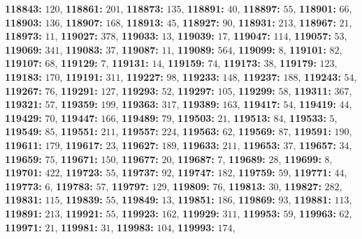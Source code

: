\textsf{\bfseries 118843:} $120$, \textsf{\bfseries 118861:} $201$, \textsf{\bfseries 118873:} $135$, \textsf{\bfseries 118891:} $40$, \textsf{\bfseries 118897:} $55$, \textsf{\bfseries 118901:} $66$, \textsf{\bfseries 118903:} $136$, \textsf{\bfseries 118907:} $168$, \textsf{\bfseries 118913:} $45$, \textsf{\bfseries 118927:} $90$, \textsf{\bfseries 118931:} $213$, \textsf{\bfseries 118967:} $21$, \textsf{\bfseries 118973:} $11$, \textsf{\bfseries 119027:} $378$, \textsf{\bfseries 119033:} $13$, \textsf{\bfseries 119039:} $17$, \textsf{\bfseries 119047:} $114$, \textsf{\bfseries 119057:} $53$, \textsf{\bfseries 119069:} $341$, \textsf{\bfseries 119083:} $37$, \textsf{\bfseries 119087:} $11$, \textsf{\bfseries 119089:} $564$, \textsf{\bfseries 119099:} $8$, \textsf{\bfseries 119101:} $82$, \textsf{\bfseries 119107:} $68$, \textsf{\bfseries 119129:} $7$, \textsf{\bfseries 119131:} $14$, \textsf{\bfseries 119159:} $74$, \textsf{\bfseries 119173:} $38$, \textsf{\bfseries 119179:} $123$, \textsf{\bfseries 119183:} $170$, \textsf{\bfseries 119191:} $311$, \textsf{\bfseries 119227:} $98$, \textsf{\bfseries 119233:} $148$, \textsf{\bfseries 119237:} $188$, \textsf{\bfseries 119243:} $54$, \textsf{\bfseries 119267:} $76$, \textsf{\bfseries 119291:} $127$, \textsf{\bfseries 119293:} $52$, \textsf{\bfseries 119297:} $105$, \textsf{\bfseries 119299:} $58$, \textsf{\bfseries 119311:} $367$, \textsf{\bfseries 119321:} $57$, \textsf{\bfseries 119359:} $199$, \textsf{\bfseries 119363:} $317$, \textsf{\bfseries 119389:} $163$, \textsf{\bfseries 119417:} $54$, \textsf{\bfseries 119419:} $44$, \textsf{\bfseries 119429:} $70$, \textsf{\bfseries 119447:} $166$, \textsf{\bfseries 119489:} $79$, \textsf{\bfseries 119503:} $21$, \textsf{\bfseries 119513:} $84$, \textsf{\bfseries 119533:} $5$, \textsf{\bfseries 119549:} $85$, \textsf{\bfseries 119551:} $211$, \textsf{\bfseries 119557:} $224$, \textsf{\bfseries 119563:} $62$, \textsf{\bfseries 119569:} $87$, \textsf{\bfseries 119591:} $190$, \textsf{\bfseries 119611:} $179$, \textsf{\bfseries 119617:} $23$, \textsf{\bfseries 119627:} $189$, \textsf{\bfseries 119633:} $211$, \textsf{\bfseries 119653:} $37$, \textsf{\bfseries 119657:} $34$, \textsf{\bfseries 119659:} $75$, \textsf{\bfseries 119671:} $150$, \textsf{\bfseries 119677:} $20$, \textsf{\bfseries 119687:} $7$, \textsf{\bfseries 119689:} $28$, \textsf{\bfseries 119699:} $8$, \textsf{\bfseries 119701:} $422$, \textsf{\bfseries 119723:} $55$, \textsf{\bfseries 119737:} $92$, \textsf{\bfseries 119747:} $182$, \textsf{\bfseries 119759:} $59$, \textsf{\bfseries 119771:} $44$, \textsf{\bfseries 119773:} $6$, \textsf{\bfseries 119783:} $57$, \textsf{\bfseries 119797:} $129$, \textsf{\bfseries 119809:} $76$, \textsf{\bfseries 119813:} $30$, \textsf{\bfseries 119827:} $282$, \textsf{\bfseries 119831:} $115$, \textsf{\bfseries 119839:} $55$, \textsf{\bfseries 119849:} $13$, \textsf{\bfseries 119851:} $186$, \textsf{\bfseries 119869:} $93$, \textsf{\bfseries 119881:} $113$, \textsf{\bfseries 119891:} $213$, \textsf{\bfseries 119921:} $55$, \textsf{\bfseries 119923:} $162$, \textsf{\bfseries 119929:} $311$, \textsf{\bfseries 119953:} $59$, \textsf{\bfseries 119963:} $62$, \textsf{\bfseries 119971:} $21$, \textsf{\bfseries 119981:} $31$, \textsf{\bfseries 119983:} $104$, \textsf{\bfseries 119993:} $174$, 
